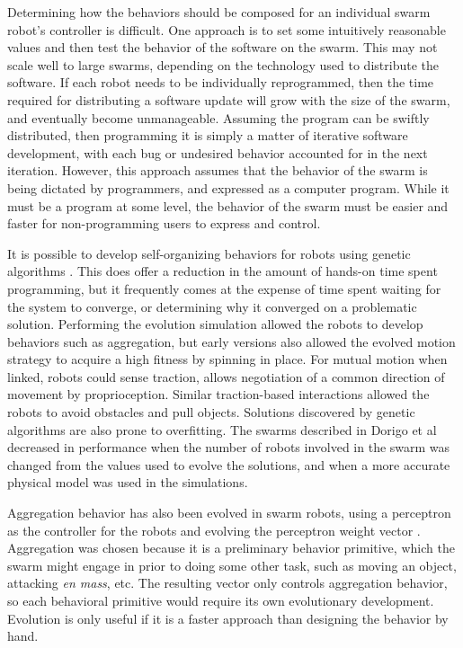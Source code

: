 \documentclass[]{article}
\begin{document}
Determining how the behaviors should be composed for an individual swarm robot's controller is difficult. 
One approach is to set some intuitively reasonable values and then test the behavior of the software on the swarm. 
This may not scale well to large swarms, depending on the technology used to distribute the software. 
If each robot needs to be individually reprogrammed, then the time required for distributing a software update will grow with the size of the swarm, and eventually become unmanageable. 
Assuming the program can be swiftly distributed, then programming it is simply a matter of iterative software development, with each bug or undesired behavior accounted for in the next iteration. 
However, this approach assumes that the behavior of the swarm is being dictated by programmers, and expressed as a computer program. 
While it must be a program at some level, the behavior of the swarm must be easier and faster for non-programming users to express and control. 

It is possible to develop self-organizing behaviors for robots using genetic algorithms \cite{dorigo2004evolving}. 
This does offer a reduction in the amount of hands-on time spent programming, but it frequently comes at the expense of time spent waiting for the system to converge, or determining why it converged on a problematic solution. 
Performing the evolution simulation allowed the robots to develop behaviors such as aggregation, but early versions also allowed the evolved motion strategy to acquire a high fitness by spinning in place. 
For mutual motion when linked, robots could sense traction, allows negotiation of a common direction of movement by proprioception. 
Similar traction-based interactions allowed the robots to avoid obstacles and pull objects. 
Solutions discovered by genetic algorithms are also prone to overfitting. 
The swarms described in Dorigo et al decreased in performance when the number of robots involved in the swarm was changed from the values used to evolve the solutions, and when a more accurate physical model was used in the simulations.

Aggregation behavior has also been evolved in swarm robots, using a perceptron as the controller for the robots and evolving the perceptron weight vector \cite{bahgecci2005evolving}. 
Aggregation was chosen because it is a preliminary behavior primitive, which the swarm might engage in prior to doing some other task, such as moving an object, attacking \emph{en mass}, etc.
The resulting vector only controls aggregation behavior, so each behavioral primitive would require its own evolutionary development. 
Evolution is only useful if it is a faster approach than designing the behavior by hand. 
\end{document}
